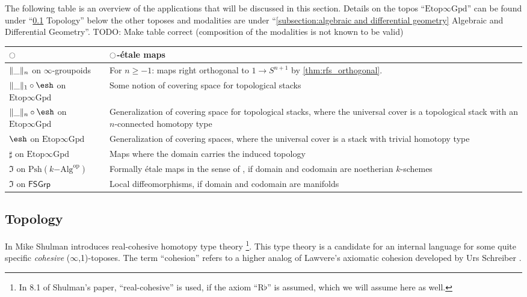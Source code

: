 \documentclass[9pt,twosided]{amsart}
\newcommand{\shape}{\ensuremath{\mathord{\raisebox{0.5pt}{\text{\rm\esh}}}}}
\newcommand{\FSGrp}{\ensuremath{\mathsf{FSGrp}}}
\newcommand{\Spaces}{\ensuremath{\mathrm{Etop}\infty\mathrm{Gpd}}}
\newcommand{\todo}[1]{{\color{red}TODO: #1 \\}}
\begin{document}
The following table is an overview of the applications that will be discussed in this section.
Details on the topos ``$\Spaces$'' can be found under ``\ref{subsection:toplogical stacks} Topology'' below the other toposes and modalities are under ``\ref{subsection:algebraic and differential geometry} Algebraic and Differential Geometry''.
\todo{Make table correct (composition of the modalities is not known to be valid)}
\begin{center}
  \begin{tabular}{p{3.5cm}p{8.5cm}}
    \toprule
    ${\ocircle}$ & ${\ocircle}$-étale maps  \\
    \midrule
    $\trunc{n}{\_}$ on $\infty$-groupoids & For $n\geq -1$: maps right orthogonal to $1\to S^{n+1}$ by \cref{thm:rfs_orthogonal}. \\
    $\trunc{1}{\_}\circ\shape$ on $\Spaces$ & Some notion of covering space for topological stacks \\
    $\trunc{n}{\_}\circ\shape$ on $\Spaces$ & Generalization of covering space for topological stacks, where the universal cover is a topological stack with an $n$-connected homotopy type \\
    $\shape$ on $\Spaces$ & Generalization of covering spaces, where the universal cover is a stack with trivial homotopy type \\
    $\sharp$ on $\Spaces$ & Maps where the domain carries the induced topology \\
    $\Im$ on $\mathrm{Psh}(k\mathrm{-Alg}^\mathrm{op})$ & Formally étale maps in the sense of \cite{GrothendieckDieudonne}, if domain and codomain are noetherian $k$-schemes   \\
    $\Im$ on $\FSGrp$ & Local diffeomorphisms, if domain and codomain are manifolds \\
    \bottomrule
  \end{tabular}
\end{center}

\bigskip

\subsection{Topology}
\label{subsection:toplogical stacks}

In \cite[Section 8]{ShulmanRealCohesion} Mike Shulman introduces real-cohesive homotopy type theory
\footnote{In 8.1 of Shulman's paper, ``real-cohesive'' is used, if the axiom ``$\mathrm{R}\flat$'' is assumed, which we will assume here as well.}.
This type theory is a candidate for an internal language for some quite specific \emph{cohesive} ($\infty$,1)-toposes.
The term ``cohesion'' refers to a higher analog 
of Lawvere's axiomatic cohesion \cite{Lawvere07} developed by Urs Schreiber \cite{SchreiberDcct}.
\end{document}
